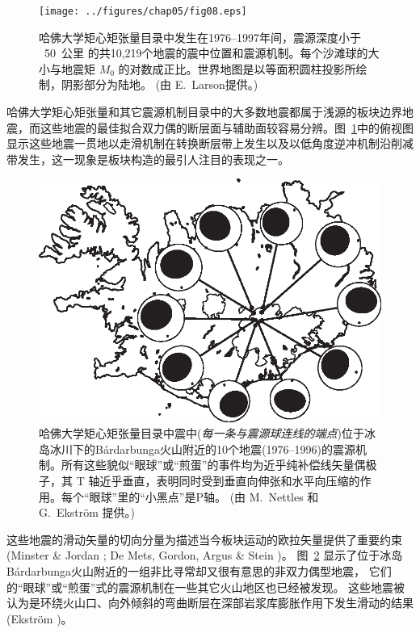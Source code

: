 \begin{figure}
\centering
{}
{
\texttt{[image: ../figures/chap05/fig08.eps]}
}
\caption[global seismicity]{
哈佛大学矩心矩张量目录中发生在1976--1997年间，震源深度小于
~50~公里 的共10,219个地震的震中位置和震源机制。每个沙滩球的大小与地震矩
$M_0$ 的对数成正比。世界地图是以等面积圆柱投影所绘制，阴影部分为陆地。
(由 E.\ Larson提供。)
}
\label{fig5.8}
\end{figure}
哈佛大学矩心矩张量和其它震源机制目录中的大多数地震都属于浅源的板块边界地震，而这些地震的最佳拟合双力偶的断层面与辅助面较容易分辨。图~\ref{fig5.8}中的俯视图显示这些地震一贯地以走滑机制在转换断层带上发生以及以低角度逆冲机制沿削减带发生，这一现象是板块构造的最引人注目的表现之一。
\begin{figure}[!b]
\begin{center}
\includegraphics{../figures/chap05/fig09.eps}
\end{center}
\caption[iceland]{
\label{fig5.9}
哈佛大学矩心矩张量目录中震中({\em 每一条与震源球连线的端点\/})位于冰岛冰川下的B\'{a}rdarbunga火山附近的10个地震(1976--1996)的震源机制。所有这些貌似“眼球”或“煎蛋”的事件均为近乎纯补偿线矢量偶极子，其 T 轴近乎垂直，表明同时受到垂直向伸张和水平向压缩的作用。每个“眼球”里的“小黑点”是P轴。
(由 M.\ Nettles 和 G.\ Ekstr\"{o}m 提供。)
}
\end{figure}
这些地震的滑动矢量的切向分量为描述当今板块运动的欧拉矢量提供了重要约束
(Minster \& Jordan
\citeyear{minster&jordan78}; De Mets, Gordon, Argus
\& Stein \citeyear{demets&al90})。
图~\ref{fig5.9} 显示了位于冰岛B\'{a}rdarbunga火山附近的一组非比寻常却又很有意思的非双力偶型地震，
%
%
它们的“眼球”或“煎蛋”式的震源机制在一些其它火山地区也已经被发现。
%
%
这些地震被认为是环绕火山口、向外倾斜的弯曲断层在深部岩浆库膨胀作用下发生滑动的结果
(Ekstr\"{o}m
\citeyear{ekstrom94})。
%


